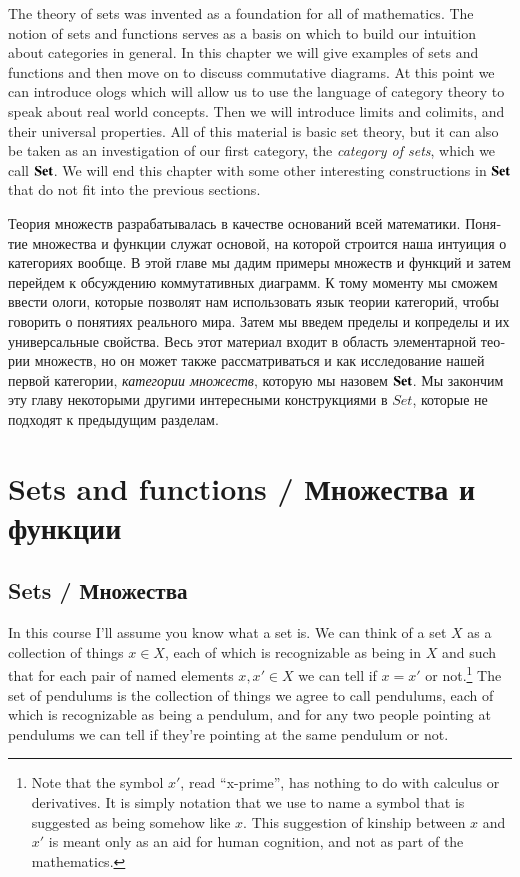 \documentclass[a4paper]{book}
\def\Set{{\bf Set}}
\theoremstyle{myth}
\begin{document}
\begin{russian}
The theory of sets was invented as a foundation for all of mathematics. The notion of sets and functions serves as a basis on which to build our intuition about categories in general. In this chapter we will give examples of sets and functions and then move on to discuss commutative diagrams. At this point we can introduce ologs which will allow us to use the language of category theory to speak about real world concepts. Then we will introduce limits and colimits, and their universal properties. All of this material is basic set theory, but it can also be taken as an investigation of our first category, the {\em category of sets}, which we call $\Set$. We will end this chapter with some other interesting constructions in $\Set$ that do not fit into the previous sections.

Теория множеств разрабатывалась в качестве оснований всей математики. Понятие множества и функции служат основой, на которой строится наша интуиция о категориях вообще. В этой главе мы дадим примеры множеств и функций и затем перейдем к обсуждению коммутативных диаграмм. К тому моменту мы сможем ввести ологи, которые позволят нам использовать язык теории категорий, чтобы говорить о понятиях реального мира. Затем мы введем пределы и копределы и их универсальные свойства. Весь этот материал входит в область элементарной теории множеств, но он может также рассматриваться и как исследование нашей первой категории, {\em категории множеств}, которую мы назовем $\Set$. Мы закончим эту главу некоторыми другими интересными конструкциями в $Set$, которые не подходят к предыдущим разделам.


\section{Sets and functions / Множества и функции}


\subsection{Sets / Множества}

In this course I'll assume you know what a set is. We can think of a set $X$ as a collection of things $x\in X$, each of which is recognizable as being in $X$ and such that for each pair of named elements $x,x'\in X$ we can tell if $x=x'$ or not.\footnote{Note that the symbol $x'$, read “x-prime”, has nothing to do with calculus or derivatives. It is simply notation that we use to name a symbol that is suggested as being somehow like $x$. This suggestion of kinship between $x$ and $x'$ is meant only as an aid for human cognition, and not as part of the mathematics.}
The set of pendulums is the collection of things we agree to call pendulums, each of which is recognizable as being a pendulum, and for any two people pointing at pendulums we can tell if they're pointing at the same pendulum or not. 


\end{russian}
\end{document}
